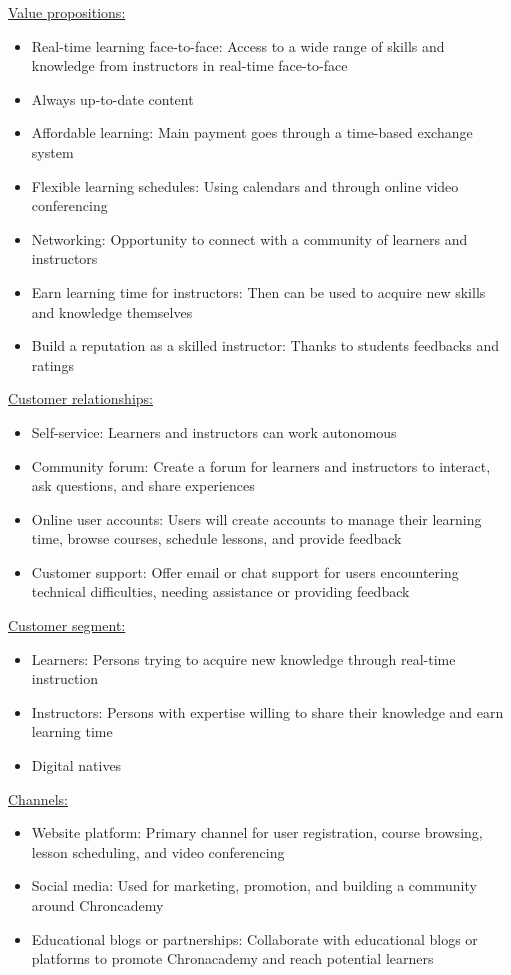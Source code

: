 \underline{Value propositions:}
\begin{itemize}
\item Real-time learning face-to-face: Access to a wide range of skills and knowledge from instructors in real-time face-to-face
\item Always up-to-date content
\item Affordable learning: Main payment goes through a time-based exchange system
\item Flexible learning schedules: Using calendars and through online video conferencing
\item Networking: Opportunity to connect with a community of learners and instructors
\item Earn learning time for instructors: Then can be used to acquire new skills and knowledge themselves
\item Build a reputation as a skilled instructor: Thanks to students feedbacks and ratings
\end{itemize}

\underline{Customer relationships:}
\begin{itemize}
\item Self-service: Learners and instructors can work autonomous
\item Community forum: Create a forum for learners and instructors to interact, ask questions, and share experiences
\item Online user accounts: Users will create accounts to manage their learning time, browse courses, schedule lessons, and provide feedback
\item Customer support: Offer email or chat support for users encountering technical difficulties, needing assistance or providing feedback
\end{itemize}

\underline{Customer segment:}
\begin{itemize}
\item Learners: Persons trying to acquire new knowledge through real-time instruction
\item Instructors: Persons with expertise willing to share their knowledge and earn learning time
\item Digital natives
\end{itemize}

\underline{Channels:}
\begin{itemize}
\item Website platform: Primary channel for user registration, course browsing, lesson scheduling, and video conferencing
\item Social media: Used for marketing, promotion, and building a community around Chroncademy
\item Educational blogs or partnerships: Collaborate with educational blogs or platforms to promote Chronacademy and reach potential learners
\end{itemize}

